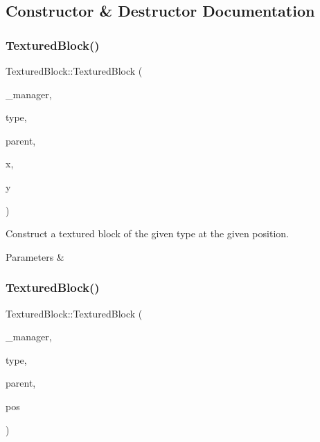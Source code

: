 \subsection{Constructor \& Destructor Documentation}
\mbox{\label{class_textured_block_a067f51d1fac16ea8610cc76a488dd976}} 
\subsubsection{\texorpdfstring{TexturedBlock()}{TexturedBlock()}\hspace{0.1cm}{\footnotesize\ttfamily [1/2]}}
{\footnotesize\ttfamily Textured\+Block\+::\+Textured\+Block (\begin{DoxyParamCaption}\item[{\mbox{\hyperlink{class_game_manager}{Game\+Manager}} $\ast$}]{\+\_\+manager,  }\item[{B\+L\+O\+C\+K\+\_\+\+T\+Y\+PE}]{type,  }\item[{\mbox{\hyperlink{class_game_entity}{Game\+Entity}} $\ast$}]{parent,  }\item[{float}]{x,  }\item[{float}]{y }\end{DoxyParamCaption})\hspace{0.3cm}{\ttfamily [inline]}}



Construct a textured block of the given type at the given position. 


\begin{DoxyParams}{Parameters}
{\em } & \\
\hline
\end{DoxyParams}
\mbox{\label{class_textured_block_a93cb4f799f831c5ddb9122554b6844eb}} 
\subsubsection{\texorpdfstring{TexturedBlock()}{TexturedBlock()}\hspace{0.1cm}{\footnotesize\ttfamily [2/2]}}
{\footnotesize\ttfamily Textured\+Block\+::\+Textured\+Block (\begin{DoxyParamCaption}\item[{\mbox{\hyperlink{class_game_manager}{Game\+Manager}} $\ast$}]{\+\_\+manager,  }\item[{B\+L\+O\+C\+K\+\_\+\+T\+Y\+PE}]{type,  }\item[{\mbox{\hyperlink{class_game_entity}{Game\+Entity}} $\ast$}]{parent,  }\item[{\mbox{\hyperlink{classsf_1_1_vector2}{sf\+::\+Vector2f}}}]{pos }\end{DoxyParamCaption})\hspace{0.3cm}{\ttfamily [inline]}}



